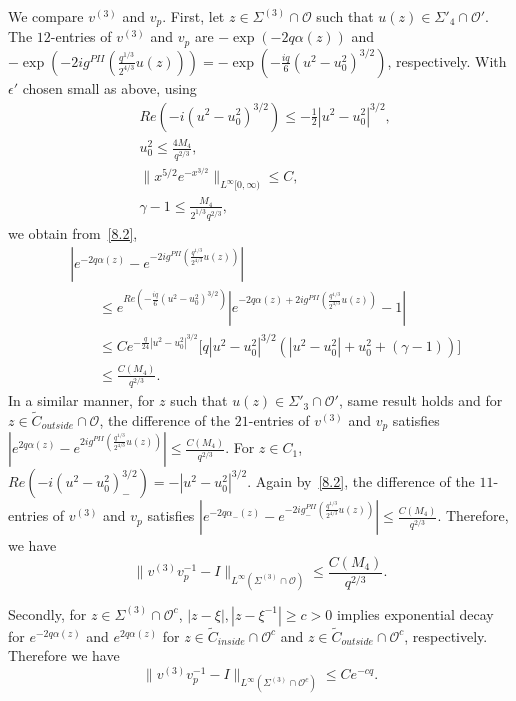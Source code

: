 \documentclass{amsart}
\theoremstyle{definition}
\theoremstyle{remark}
\numberwithin{equation}{section}
\newcommand{\wt}{\widetilde}
\begin{document}
We compare 
$v^{(3)}$ and $v_p$.
First, let $z\in \Sigma^{(3)}\cap\mathcal{O}$
such that $u(z)\in\Sigma'_4\cap\mathcal{O}'$. 
The $12$-entries of $v^{(3)}$ and $v_p$ are 
$-\exp(-2q\alpha(z))$ and $-\exp(-2ig^{PII}(\frac{q^{1/3}}{2^{4/3}}u(z)))
=-\exp(-\frac{iq}6(u^2-u_0^2)^{3/2})$, respectively.
With $\epsilon'$ chosen small as above, using 
\begin{align*}
  &Re(-i(u^2-u_0^2)^{3/2})\le -\frac12|u^2-u_0^2|^{3/2},\\
  &u_0^2\le \frac{4M_4}{q^{2/3}},\\
  &\|x^{5/2}e^{-x^{3/2}}\|_{L^{\infty}[0,\infty)} \le C,\\
  &\gamma-1 \le \frac{M_4}{2^{1/3}q^{2/3}},
\end{align*}
we obtain from~\eqref{8.2},
\begin{equation}
  \begin{split}
    &|e^{-2q\alpha(z)} - e^{-2ig^{PII}(\frac{q^{1/3}}{2^{4/3}}u(z))}|\\ 
    &\qquad \le e^{Re(-\frac{iq}6(u^2-u_0^2)^{3/2})} 
|e^{-2q\alpha(z)+2ig^{PII}(\frac{q^{1/3}}{2^{4/3}}u(z))} -1|\\
    &\qquad \le Ce^{-\frac{q}{24}|u^2-u_0^2|^{3/2}} 
\bigl[ q|u^2-u_0^2|^{3/2}(|u^2-u_0^2|+u_0^2+(\gamma-1)) \bigr]\\
    &\qquad \le \frac{C(M_4)}{q^{2/3}}.
  \end{split}
\end{equation}
In a similar manner, for $z$ such that $u(z)\in\Sigma'_3\cap\mathcal{O}'$, 
same result holds and for $z\in\wt{C}_{outside}\cap\mathcal{O}$, 
the difference of the $21$-entries of $v^{(3)}$ and $v_p$ satisfies 
$|e^{2q\alpha(z)} - e^{2ig^{PII}(\frac{q^{1/3}}{2^{4/3}}u(z))}|
\le\frac{C(M_4)}{q^{2/3}}$.
For $z\in C_1$,  
$Re(-i(u^2-u_0^2)_-^{3/2})=-|u^2-u_0^2|^{3/2}$.  
Again by~\eqref{8.2}, 
the difference of the $11$-entries of $v^{(3)}$ and $v_p$ satisfies
$|e^{-2q\alpha_-(z)} - e^{-2ig_-^{PII}(\frac{q^{1/3}}{2^{4/3}}u(z))}|
\le\frac{C(M_4)}{q^{2/3}}$.
Therefore, we have
\begin{equation}\label{8.7}
   \|v^{(3)}v_p^{-1} -I\|_{L^{\infty}(\Sigma^{(3)}\cap\mathcal{O})}
\le\frac{C(M_4)}{q^{2/3}}.
\end{equation}

Secondly, for $z\in\Sigma^{(3)}\cap\mathcal{O}^c$, 
$|z-\xi|,|z-\xi^{-1}|\geq c>0$ implies 
exponential decay for $e^{-2q\alpha(z)}$ and $e^{2q\alpha(z)}$ 
for $z\in\wt{C}_{inside}\cap\mathcal{O}^c$ and 
$z\in\wt{C}_{outside}\cap\mathcal{O}^c$, respectively.
Therefore we have 
\begin{equation}\label{8.8}
   \|v^{(3)}v_p^{-1} -I\|_{L^{\infty}(\Sigma^{(3)}\cap\mathcal{O}^c)} 
\le Ce^{-cq}.
\end{equation}
\end{document}
